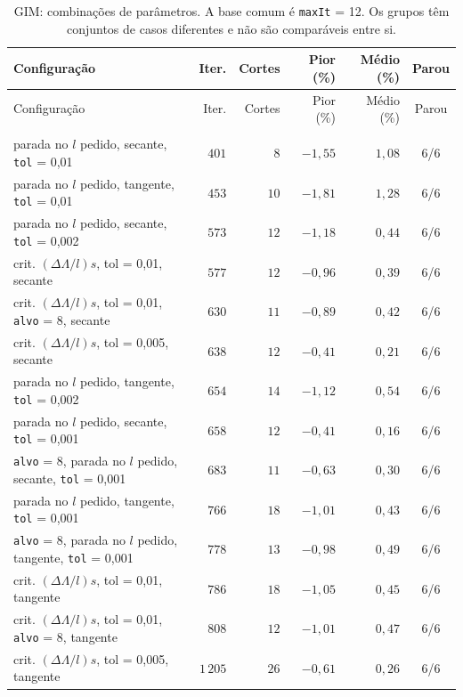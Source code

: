 \documentclass[11pt,a4paper]{article}
\numberwithin{equation}{section}
\begin{document}
{\footnotesize
\begin{longtable}{p{7.8cm}rrrrc}
\caption{GIM: combinações de parâmetros. A base comum é \texttt{maxIt} = 12. Os grupos têm conjuntos de casos diferentes e não são comparáveis entre si.}\label{tab:fatorial_gim}\\
\toprule
Configuração & Iter. & Cortes & Pior (\%) & Médio (\%) & Parou \\
\midrule
\endfirsthead
\toprule
Configuração & Iter. & Cortes & Pior (\%) & Médio (\%) & Parou \\
\midrule
\endhead
\bottomrule
\endfoot
\multicolumn{6}{l}{\textit{6 casos}} \\
parada no $l$ pedido, secante, \texttt{tol} = 0,01 & $401$ & $8$ & $-1{,}55$ & $1{,}08$ & 6/6 \\
parada no $l$ pedido, tangente, \texttt{tol} = 0,01 & $453$ & $10$ & $-1{,}81$ & $1{,}28$ & 6/6 \\
parada no $l$ pedido, secante, \texttt{tol} = 0,002 & $573$ & $12$ & $-1{,}18$ & $0{,}44$ & 6/6 \\
crit. $(\Delta\Lambda/l)s$, tol = 0,01, secante & $577$ & $12$ & $-0{,}96$ & $0{,}39$ & 6/6 \\
crit. $(\Delta\Lambda/l)s$, tol = 0,01, \texttt{alvo} = 8, secante & $630$ & $11$ & $-0{,}89$ & $0{,}42$ & 6/6 \\
crit. $(\Delta\Lambda/l)s$, tol = 0,005, secante & $638$ & $12$ & $-0{,}41$ & $0{,}21$ & 6/6 \\
parada no $l$ pedido, tangente, \texttt{tol} = 0,002 & $654$ & $14$ & $-1{,}12$ & $0{,}54$ & 6/6 \\
parada no $l$ pedido, secante, \texttt{tol} = 0,001 & $658$ & $12$ & $-0{,}41$ & $0{,}16$ & 6/6 \\
\texttt{alvo} = 8, parada no $l$ pedido, secante, \texttt{tol} = 0,001 & $683$ & $11$ & $-0{,}63$ & $0{,}30$ & 6/6 \\
parada no $l$ pedido, tangente, \texttt{tol} = 0,001 & $766$ & $18$ & $-1{,}01$ & $0{,}43$ & 6/6 \\
\texttt{alvo} = 8, parada no $l$ pedido, tangente, \texttt{tol} = 0,001 & $778$ & $13$ & $-0{,}98$ & $0{,}49$ & 6/6 \\
crit. $(\Delta\Lambda/l)s$, tol = 0,01, tangente & $786$ & $18$ & $-1{,}05$ & $0{,}45$ & 6/6 \\
crit. $(\Delta\Lambda/l)s$, tol = 0,01, \texttt{alvo} = 8, tangente & $808$ & $12$ & $-1{,}01$ & $0{,}47$ & 6/6 \\
crit. $(\Delta\Lambda/l)s$, tol = 0,005, tangente & $1\,205$ & $26$ & $-0{,}61$ & $0{,}26$ & 6/6 \\

\end{longtable}}
\end{document}
